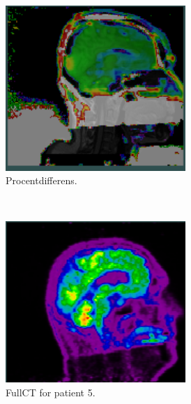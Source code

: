 \begin{figure}
\begin{subfigure}{0.3\textwidth}
        \centering
        \includegraphics[width=0.75\textwidth]{colager/loocv_pet/loocv_010960_pet_pd.png}
        \caption{Procentdifferens.}
        \label{col:loocv_pet_pat4_pd}
    \end{subfigure}\\
    \begin{subfigure}{0.3\textwidth}
        \centering
        \includegraphics[width=0.75\textwidth]{colager/loocv_pet/loocv_011030_pet_ct.png}
        \caption{FullCT for patient 5.}
        \label{col:loocv_pet_pat5_ct}
    \end{subfigure}\hfill
    \begin{subfigure}{0.3\textwidth}
        \centering

\end{subfigure}
\end{figure}
